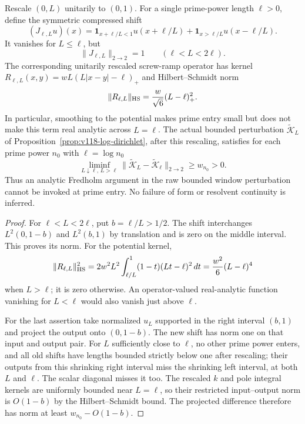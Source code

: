 \begin{proposition}
\label{prop:ns55-prime-entry}
Rescale $(0,L)$ unitarily to $(0,1)$. For a single prime-power length
$\ell>0$, define the symmetric compressed shift
\[
 (J_{\ell,L}u)(x)=
 \mathbf1_{x+\ell/L<1}u(x+\ell/L)
 +\mathbf1_{x>\ell/L}u(x-\ell/L).
\]
It vanishes for $L\le\ell$, but
\begin{equation}\label{eq:ns55-prime-entry-norm}
 \|J_{\ell,L}\|_{2\to2}=1\qquad(\ell<L<2\ell).
\end{equation}
The corresponding unitarily rescaled screw-ramp operator has kernel
$R_{\ell,L}(x,y)=wL(L|x-y|-\ell)_+$ and Hilbert--Schmidt norm
\begin{equation}\label{eq:ns55-ramp-norm}
 \|R_{\ell,L}\|_{\rm HS}
      =\frac{w}{\sqrt6}(L-\ell)_+^2.
\end{equation}
In particular, smoothing to the potential makes prime entry small
but does not make this term real analytic across $L=\ell$.
The actual bounded perturbation $\widetilde{\mathcal K}_L$ of
Proposition~\ref{prop:v118-log-dirichlet}, after this rescaling,
satisfies for each prime power $n_0$ with $\ell=\log n_0$
\begin{equation}\label{eq:ns55-full-k-jump}
 \liminf_{L\downarrow\ell,\,L>\ell}
 \|\widetilde{\mathcal K}_L-
             \widetilde{\mathcal K}_{\ell}\|_{2\to2}\ge w_{n_0}>0.
\end{equation}
Thus an analytic Fredholm argument in the raw bounded window
perturbation cannot be invoked at prime entry. No failure of
form or resolvent continuity is inferred.
\end{proposition}
\begin{proof}
For $\ell<L<2\ell$, put $b=\ell/L>1/2$. The shift interchanges
$L^2(0,1-b)$ and $L^2(b,1)$ by translation and is zero on the
middle interval. This proves its norm. For the potential kernel,
\[
 \|R_{\ell,L}\|_{\rm HS}^2
 =2w^2L^2\int_{\ell/L}^1(1-t)(Lt-\ell)^2\,dt
 =\frac{w^2}{6}(L-\ell)^4
\]
when $L>\ell$; it is zero otherwise. An operator-valued real-analytic
function vanishing for $L<\ell$ would also vanish just above $\ell$.

For the last assertion take normalized $u_L$ supported in the
right interval $(b,1)$ and project the output onto $(0,1-b)$.
The new shift has norm one on that input and output pair. For $L$
sufficiently close to $\ell$, no other prime power enters, and
all old shifts have lengths bounded strictly below one after
rescaling; their outputs from this shrinking right interval miss
the shrinking left interval, at both $L$ and $\ell$.
The scalar diagonal misses it too. The rescaled $k$ and pole
integral kernels are uniformly bounded near $L=\ell$, so their
restricted input--output norm is $O(1-b)$ by the Hilbert--Schmidt
bound. The projected difference therefore has norm at least
$w_{n_0}-O(1-b)$.
\end{proof}

